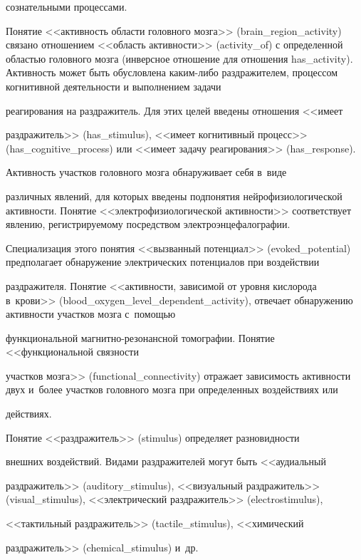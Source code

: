 сознательными процессами.

      

      Понятие <<активность области головного мозга>> (brain\_region\_activity) связано отношением <<область активности>> (activity\_of) с определенной областью головного мозга (инверсное отношение для отношения has\_activity). Активность может быть обусловлена каким-либо раздражителем, процессом когнитивной деятельности и выполнением задачи 

реагирования на раздражитель. Для этих целей введены отношения <<имеет 

раздражитель>> (has\_stimulus), <<имеет когнитивный процесс>> (has\_cognitive\_process) или <<имеет задачу реагирования>> (has\_response).

      

      Активность участков головного мозга обнаруживает себя в~виде 

различных явлений, для которых введены подпонятия нейрофизиологической активности. Понятие <<электрофизиологической активности>> соответствует явлению, ре\-гист\-ри\-ру\-емо\-му посредством электроэнцефалографии. 

Специализация этого понятия <<вызванный потенциал>> (evoked\_potential) предполагает обнаружение электрических потенциалов при воздействии 

раздражителя. Понятие <<активности, зависимой от уровня кислорода в~крови>> (blood\_oxygen\_level\_dependent\_activity), отвечает обнаружению активности участков мозга с~помощью 

функциональной маг\-нит\-но-ре\-зо\-нанс\-ной томографии. Понятие <<функциональной связности 

участков мозга>> (functional\_connectivity) отражает зависимость активности двух и~более участков головного мозга при определенных воздействиях или 

действиях.

      

      Понятие <<раздражитель>> (stimulus) определяет разновидности 

внешних воздействий. Видами раздражителей могут быть <<аудиальный 

раздражитель>> (auditory\_stimulus), <<визуальный раздражитель>> (visual\_stimulus), <<электрический раздражитель>> (electrostimulus), 

<<тактильный раздражитель>> (tactile\_stimulus), <<химический 

раздражитель>> (chemical\_stimulus) и~др. 

